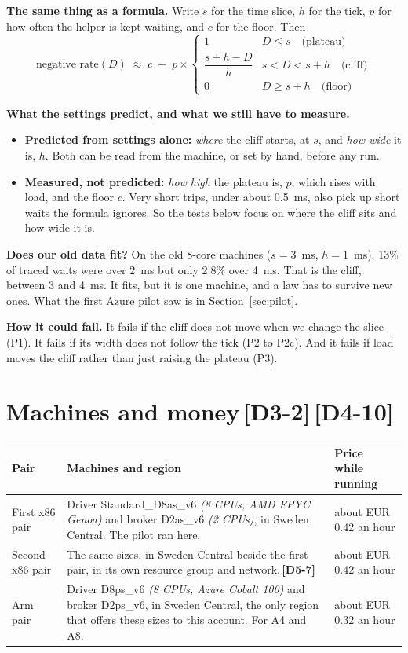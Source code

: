 \documentclass[11pt]{article}
\newcommand{\gl}[1]{{\color{soft}\itshape\small (#1)}}
\newcommand{\chgold}[1]{\,{\color{oldcol}\bfseries\footnotesize[#1]}}
\begin{document}
\textbf{The same thing as a formula.} Write $s$ for the time slice, $h$ for the tick, $p$ for how often the helper is kept waiting, and $c$ for the floor. Then
\[
\text{negative rate}(D) \;\approx\; c \;+\; p \times
\begin{cases}
1 & D \le s \quad\text{(plateau)}\\[2pt]
\dfrac{s + h - D}{h} & s < D < s + h \quad\text{(cliff)}\\[6pt]
0 & D \ge s + h \quad\text{(floor)}
\end{cases}
\]

\textbf{What the settings predict, and what we still have to measure.}
\begin{itemize}
  \item \textbf{Predicted from settings alone:} \emph{where} the cliff starts, at $s$, and \emph{how wide} it is, $h$. Both can be read from the machine, or set by hand, before any run.
  \item \textbf{Measured, not predicted:} \emph{how high} the plateau is, $p$, which rises with load, and the floor $c$. Very short trips, under about 0.5~ms, also pick up short waits the formula ignores. So the tests below focus on where the cliff sits and how wide it is.
\end{itemize}

\textbf{Does our old data fit?} On the old 8-core machines ($s = 3$~ms, $h = 1$~ms), 13\% of traced waits were over 2~ms but only 2.8\% over 4~ms. That is the cliff, between 3 and 4~ms. It fits, but it is one machine, and a law has to survive new ones. What the first Azure pilot saw is in Section~\ref{sec:pilot}.

\textbf{How it could fail.} It fails if the cliff does not move when we change the slice (P1). It fails if its width does not follow the tick (P2 to P2c). And it fails if load moves the cliff rather than just raising the plateau (P3).

\section[Machines and money]{Machines and money\protect\chgold{D3-2}\protect\chgold{D4-10}}
{\small
\begin{tabularx}{\linewidth}{@{}p{2.8cm} X p{3.1cm}@{}}
\toprule
\textbf{Pair} & \textbf{Machines and region} & \textbf{Price while running} \\
\midrule
First x86 pair & Driver Standard\_D8as\_v6 \gl{8 CPUs, AMD EPYC Genoa} and broker D2as\_v6 \gl{2 CPUs}, in Sweden Central. The pilot ran here. & about EUR 0.42 an hour \\
Second x86 pair & The same sizes, in Sweden Central beside the first pair, in its own resource group and network.\chgold{D5-7} & about EUR 0.42 an hour \\
Arm pair & Driver D8ps\_v6 \gl{8 CPUs, Azure Cobalt 100} and broker D2ps\_v6, in Sweden Central, the only region that offers these sizes to this account. For A4 and A8. & about EUR 0.32 an hour \\
\bottomrule
\end{tabularx}}
\end{document}

